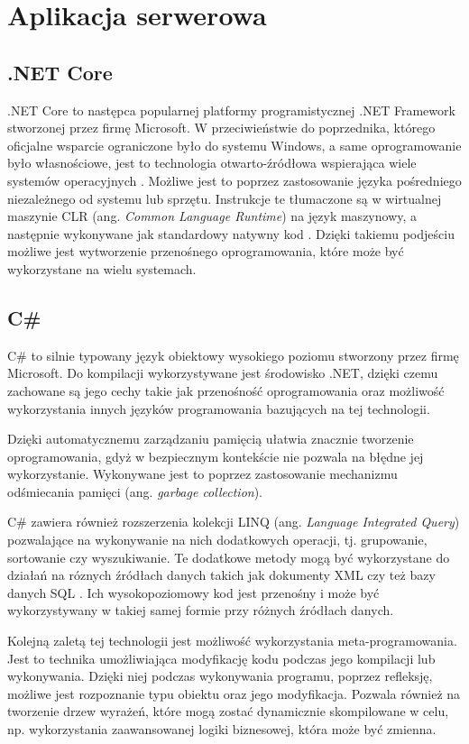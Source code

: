 \section{Aplikacja serwerowa}

\subsection*{.NET Core}
.NET Core to następca popularnej platformy programistycznej .NET Framework stworzonej przez
firmę Microsoft. W przeciwieństwie do poprzednika, którego oficjalne wsparcie ograniczone było
do systemu Windows, a same oprogramowanie było własnościowe, jest to technologia otwarto-źródłowa
wspierająca wiele systemów operacyjnych \cite{price2021c}. Możliwe jest to poprzez zastosowanie
języka pośredniego niezależnego od systemu lub sprzętu. Instrukcje te tłumaczone są w 
wirtualnej maszynie CLR (ang. \textit{Common Language Runtime}) na język maszynowy, a
następnie wykonywane jak standardowy natywny kod \cite{msdn:clr}. Dzięki takiemu podjeściu
możliwe jest wytworzenie przenośnego oprogramowania, które może być wykorzystane na wielu
systemach.

\subsection*{C\#}
C\# to silnie typowany język obiektowy wysokiego poziomu stworzony przez firmę Microsoft.
Do kompilacji wykorzystywane jest środowisko .NET, dzięki czemu zachowane są
jego cechy takie jak przenośność oprogramowania oraz możliwość wykorzystania
innych języków programowania bazujących na tej technologii.

Dzięki automatycznemu zarządzaniu pamięcią ułatwia znacznie tworzenie
oprogramowania, gdyż w bezpiecznym kontekście nie pozwala na 
błędne jej wykorzystanie. Wykonywane jest to poprzez zastosowanie
mechanizmu odśmiecania pamięci (ang. \textit{garbage collection}).

C\# zawiera również rozszerzenia kolekcji LINQ (ang. \textit{Language Integrated Query})
pozwalające na wykonywanie na nich dodatkowych operacji, tj. grupowanie, sortowanie czy wyszukiwanie.
Te dodatkowe metody mogą być wykorzystane do działań na róznych źródłach danych takich jak dokumenty XML
czy też bazy danych SQL \cite{zhang2014}. Ich wysokopoziomowy kod jest przenośny i może być
wykorzystywany w takiej samej formie przy różnych źródłach danych.

Kolejną zaletą tej technologii jest możliwość wykorzystania meta-programowania. 
Jest to technika umożliwiająca modyfikację kodu podczas jego kompilacji lub wykonywania. 
Dzięki niej podczas wykonywania programu, poprzez refleksję, możliwe jest rozpoznanie
typu obiektu oraz jego modyfikacja. Pozwala również na tworzenie drzew wyrażeń, które
mogą zostać dynamicznie skompilowane w celu, np. wykorzystania zaawansowanej logiki
biznesowej, która może być zmienna.


